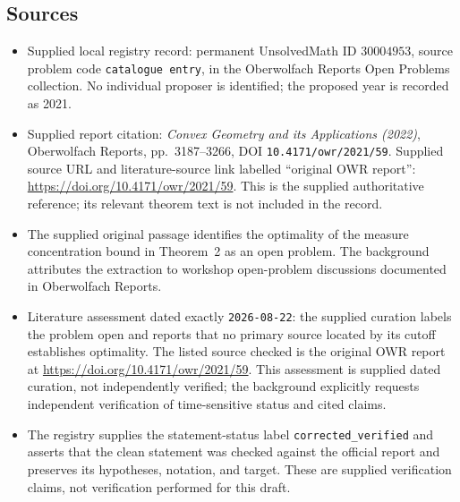\documentclass[11pt]{article}
\begin{document}
\subsection{Sources}
\begin{itemize}
\item Supplied local registry record: permanent UnsolvedMath ID \(30004953\), source problem code \texttt{catalogue entry}, in the Oberwolfach Reports Open Problems collection. No individual proposer is identified; the proposed year is recorded as 2021.
\item Supplied report citation: \emph{Convex Geometry and its Applications (2022)}, Oberwolfach Reports, pp.~3187--3266, DOI \texttt{10.4171/owr/2021/59}. Supplied source URL and literature-source link labelled ``original OWR report'': \url{https://doi.org/10.4171/owr/2021/59}. This is the supplied authoritative reference; its relevant theorem text is not included in the record.
\item The supplied original passage identifies the optimality of the measure concentration bound in Theorem~2 as an open problem. The background attributes the extraction to workshop open-problem discussions documented in Oberwolfach Reports.
\item Literature assessment dated exactly \texttt{2026-08-22}: the supplied curation labels the problem open and reports that no primary source located by its cutoff establishes optimality. The listed source checked is the original OWR report at \url{https://doi.org/10.4171/owr/2021/59}. This assessment is supplied dated curation, not independently verified; the background explicitly requests independent verification of time-sensitive status and cited claims.
\item The registry supplies the statement-status label \texttt{corrected\_verified} and asserts that the clean statement was checked against the official report and preserves its hypotheses, notation, and target. These are supplied verification claims, not verification performed for this draft.
\end{itemize}
\end{document}
